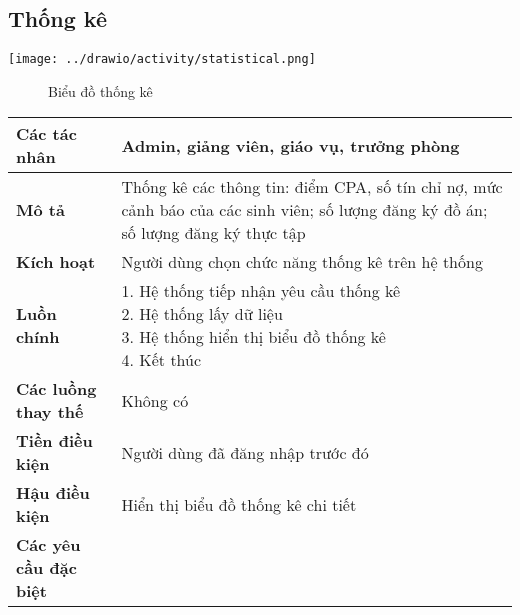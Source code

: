 \subsection{Thống kê}
\begin{center}
	\texttt{[image: ../drawio/activity/statistical.png]}
	\begin{figure}[h]
		\centering
		\caption{Biểu đồ thống kê}
	\end{figure}
\end{center}
\begin{tabular}{|l|p{}|}
	\hline
	\textbf{Các tác nhân}         & Admin, giảng viên, giáo vụ, trưởng phòng                                                                                           \\
	\hline
	\textbf{Mô tả}                & Thống kê các thông tin: điểm CPA, số tín chỉ nợ, mức cảnh báo của các sinh viên; số lượng đăng ký đồ án; số lượng đăng ký thực tập \\
	\hline
	\textbf{Kích hoạt}            & Người dùng chọn chức năng thống kê trên hệ thống                                                                                   \\
	\hline
	\textbf{Luồn chính}           & \makecell[l]{1. Hệ thống tiếp nhận yêu cầu thống kê                                                                                \\ 2. Hệ thống lấy dữ liệu \\ 3. Hệ thống hiển thị biểu đồ thống kê \\ 4. Kết thúc} \\
	\hline
	\textbf{Các luồng thay thế}   & Không có                                                                                                                           \\
	\hline
	\textbf{Tiền điều kiện}       & Người dùng đã đăng nhập trước đó                                                                                                   \\
	\hline
	\textbf{Hậu điều kiện}        & Hiển thị biểu đồ thống kê chi tiết                                                                                                 \\
	\hline
	\textbf{Các yêu cầu đặc biệt} &                                                                                                                                    \\
	\hline
\end{tabular}

